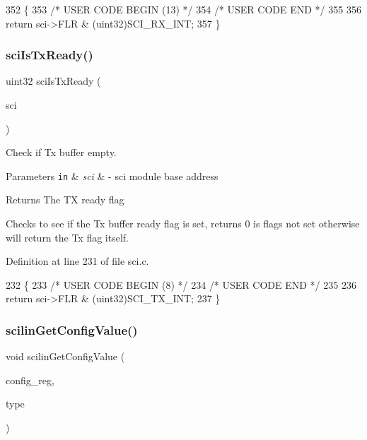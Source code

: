 \begin{DoxyCode}
352 \{
353 \textcolor{comment}{/* USER CODE BEGIN (13) */}
354 \textcolor{comment}{/* USER CODE END */}
355 
356     \textcolor{keywordflow}{return} sci->FLR & (uint32)SCI\_RX\_INT;
357 \}
\end{DoxyCode}
\mbox{\label{group__SCI_gaafd91cc5c28a92fa211e96e06b3fc34c}} 
\subsubsection{\texorpdfstring{sci\+Is\+Tx\+Ready()}{sciIsTxReady()}}
{\footnotesize\ttfamily uint32 sci\+Is\+Tx\+Ready (\begin{DoxyParamCaption}\item[{\mbox{\hyperlink{reg__sci_8h_ad5e2af74efb062728408d4ac1b7735db}{sci\+B\+A\+S\+E\+\_\+t}} $\ast$}]{sci }\end{DoxyParamCaption})}



Check if Tx buffer empty. 


\begin{DoxyParams}[1]{Parameters}
\mbox{\tt in}  & {\em sci} & -\/ sci module base address\\
\hline
\end{DoxyParams}
\begin{DoxyReturn}{Returns}
The TX ready flag
\end{DoxyReturn}
Checks to see if the Tx buffer ready flag is set, returns 0 is flags not set otherwise will return the Tx flag itself. 

Definition at line 231 of file sci.\+c.


\begin{DoxyCode}
232 \{
233 \textcolor{comment}{/* USER CODE BEGIN (8) */}
234 \textcolor{comment}{/* USER CODE END */}
235 
236     \textcolor{keywordflow}{return} sci->FLR & (uint32)SCI\_TX\_INT;
237 \}
\end{DoxyCode}
\mbox{\label{group__SCI_ga2418574fe9c3d642db1f134926ac6934}} 
\subsubsection{\texorpdfstring{scilin\+Get\+Config\+Value()}{scilinGetConfigValue()}}
{\footnotesize\ttfamily void scilin\+Get\+Config\+Value (\begin{DoxyParamCaption}\item[{\mbox{\hyperlink{structsci__config__reg}{sci\+\_\+config\+\_\+reg\+\_\+t}} $\ast$}]{config\+\_\+reg,  }\item[{\mbox{\hyperlink{sys__common_8h_a9daf9a5992391b058477d28d107ee5e2}{config\+\_\+value\+\_\+type\+\_\+t}}}]{type }\end{DoxyParamCaption})}



